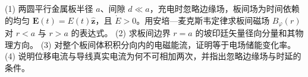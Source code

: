 (1) 两圆平行金属板半径 \(a\)、间隙 \(d\ll a\)，充电时忽略边缘场，板间场为时间依赖的均匀 \(\mathbf E(t)=E(t)\hat{\mathbf z}\)，且 \(\dot E>0\)。用安培—麦克斯韦定律求板间磁场 \(B_\varphi(r)\) 对 \(r<a\) 与 \(r>a\) 的表达式。
(2) 求板间边界 \(r=a\) 的坡印廷矢量径向分量和其物理方向。
(3) 对整个板间体积积分向内的电磁能流，证明等于电场储能变化率。
(4) 说明位移电流与导线真实电流为何不可相加两次，并指出忽略边缘场与时延的条件。

